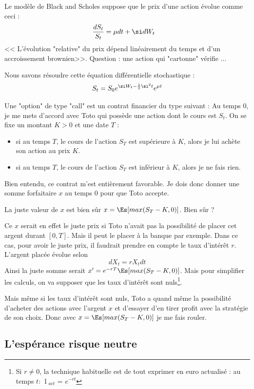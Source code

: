 \documentclass{article}
\begin{document}
 Le modèle de Black and Scholes suppose que le prix d'une action évolue comme ceci : 
 \begin{alignat}{1} 
 \frac{d S_t}{S_t}  &=    \mu  dt +   \si   d W_t  
\end{alignat}
<< L'évolution "relative" du prix dépend linéairement du temps et d'un accroissement brownien>>. Question : une action qui "cartonne" vérifie ... 


Nous savons résoudre cette équation différentielle stochastique : 
$$
S_t=   S_0 e^{\si W_t -\frac 1 2 \si^2t  } e^{\mu t}
$$

Une "option" de type "call" est un contrat financier du type suivant :  Au temps $0$,  je me mets d'accord avec Toto qui possède  une action dont le cours est $ S_t$.    On se fixe un montant $K>0$ et une date $T$ :
   \begin{itemize}
   \item si au temps $T$,  le cours de l'action $S_T$ est supérieure à $K$, alors je lui achète son action au prix $K$.
   \item si au temps $T$,  le cours de l'action $S_T$ est inférieur à $K$, alors je ne fais rien. 
   \end{itemize}
Bien entendu, ce contrat m'est entièrement favorable.  Je dois donc donner une somme forfaitaire $x$ au temps $0$ pour que Toto accepte. 
        
La juste valeur de $x$ est bien sûr $x=\Es[max(S_T -K,0)]$.  Bien sûr ?  


Ce $x$   serait en effet le juste prix si Toto n'avait pas la possibilité de placer cet argent durant $[0,T]$.  Mais il peut le placer à la banque par exemple. Dans ce cas, pour avoir le juste prix, il faudrait  prendre en compte le taux d'intérêt $r$.  L'argent placée évolue selon 
$$
dX_t =  r X_t dt
$$  
Ainsi la juste somme serait $x'=e^{-rT}\Es[max(S_T -K,0)]$.   Mais pour simplifier les calculs, on va supposer que les taux d'intérêt sont nuls\footnote{Si $r\neq0$, la technique habituelle est de tout exprimer en euro actualisé :  au temps $t:$ 1\EUR$\,_{act}$ = $e^{-rt}$ \EUR  }.

Mais même si les taux d'intérêt sont nuls,  Toto a quand même la possibilité d'acheter des actions avec l'argent $x$ et d'essayer d'en tirer profit avec la stratégie de son choix.  Donc avec $x=\Es[max(S_T -K,0)]$ je me fais rouler. 


\subsection{L'espérance risque neutre}
\end{document}
